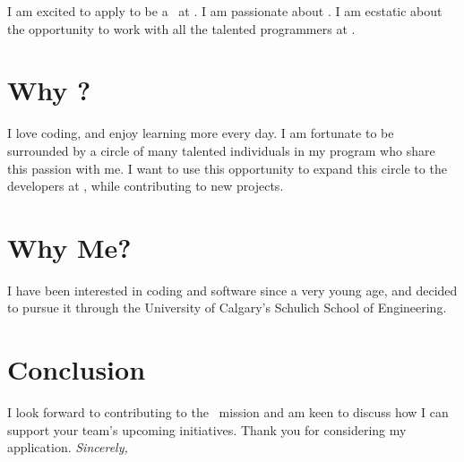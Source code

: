 I am excited to apply to be a \jobTitle~at \companyName. I am passionate about \introTopics. I am ecstatic about the opportunity to work with all the talented programmers at \companyName.

\section{Why \companyName?}
I love coding, and enjoy learning more every day. I am fortunate to be surrounded by a circle of many talented individuals in my program who share this passion with me. I want to use this opportunity to expand this circle to the developers at \companyName, while contributing to new projects.

\section{Why Me?}
I have been interested in coding and software since a very young age, and decided to pursue it through the University of Calgary’s Schulich School of Engineering. \whyMePersonalized{}

\section{Conclusion}
I look forward to contributing to the \companyName~mission and am keen to discuss how I can support your team's upcoming initiatives. Thank you for considering my application.
\newline
\newline
\large{
	\textit{Sincerely,}\\
	\userFullName
}


